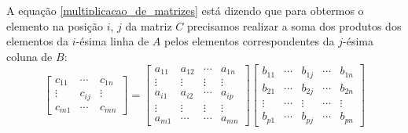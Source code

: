 \documentclass{beamer}
\begin{document}
  \begin{frame}
    A equação \eqref{multiplicacao_de_matrizes} está dizendo que para obtermos o elemento na posição $i$, $j$ da matriz $C$ precisamos
    realizar a soma dos produtos dos elementos da $i$-ésima linha de $A$ pelos elementos correspondentes da $j$-ésima coluna de $B$:
    \[
      \begin{bmatrix}
        c_{11} & \cdots & c_{1n}\\
        \vdots & c_{ij} & \vdots\\
        c_{m1} & \cdots & c_{mn}
      \end{bmatrix} = \begin{bmatrix}
        a_{11} & a_{12} & \cdots & a_{1n}\\
        \vdots & \vdots & \vdots & \vdots\\
        a_{i1} & a_{i2} & \cdots & a_{ip}\\
        \vdots & \vdots & \vdots & \vdots\\
        a_{m1} & \cdots & \cdots & a_{mn}
      \end{bmatrix} \begin{bmatrix}
        b_{11} & \cdots & b_{1j} & \cdots & b_{1n}\\
        b_{21} & \cdots & b_{2j} & \cdots & b_{2n}\\
        \vdots & \cdots & \vdots & \cdots & \vdots\\
        b_{p1} & \cdots & b_{pj} & \cdots & b_{pn}
      \end{bmatrix}
    \]
  \end{frame}
\end{document}
